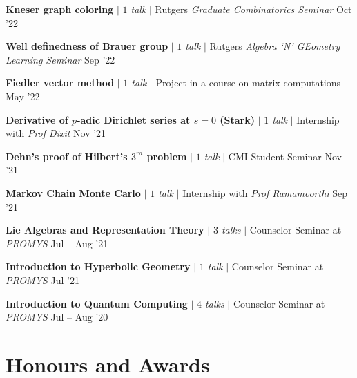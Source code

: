 \resumeProjectHeading
{\textbf{Kneser graph coloring} $|$ \emph{$1$ talk} $|$ Rutgers \textit{Graduate Combinatorics Seminar}}
{Oct '22}
{}
\vspace{-20pt}


\resumeProjectHeading
{\textbf{Well definedness of Brauer group} $|$ \emph{$1$ talk} $|$ Rutgers \textit{Algebra `N' GEometry Learning Seminar}}
{Sep '22}
{}
\vspace{-20pt}


\resumeProjectHeading
{\textbf{Fiedler vector method} $|$ \emph{$1$ talk} $|$ Project in a course on matrix computations}
{May '22}
{}
\vspace{-20pt}

\resumeProjectHeading
{\textbf{Derivative of $p$-adic Dirichlet series at $s=0$ (Stark)} $|$ \emph{$1$ talk} $|$ Internship with \textit{Prof Dixit}}
{Nov '21}
{}
\vspace{-20pt}

\resumeProjectHeading
{\textbf{Dehn's proof of Hilbert's $3^{rd}$ problem} $|$ \emph{$1$ talk} $|$ CMI Student Seminar}
{Nov '21}
{}
\vspace{-20pt}

\resumeProjectHeading
{\textbf{Markov Chain Monte Carlo} $|$ \emph{$1$ talk} $|$ Internship with \textit{Prof Ramamoorthi}}
{Sep '21}
{}
\vspace{-20pt}


\resumeProjectHeading
{\textbf{Lie Algebras and Representation Theory} $|$ \emph{$3$ talks} $|$ Counselor Seminar at \textit{PROMYS}}
{Jul -- Aug '21}
{}
\vspace{-20pt}

\resumeProjectHeading
{\textbf{Introduction to Hyperbolic Geometry} $|$ \emph{$1$ talk} $|$ Counselor Seminar at \textit{PROMYS}}
{Jul '21}
{}
\vspace{-20pt}

\resumeProjectHeading
{\textbf{Introduction to Quantum Computing} $|$ \emph{$4$ talks} $|$ Counselor Seminar at \textit{PROMYS}}
{Jul -- Aug '20}
{}
\resumeSubHeadingListEnd











\section{Honours and Awards}
\resumeSubHeadingListStart

